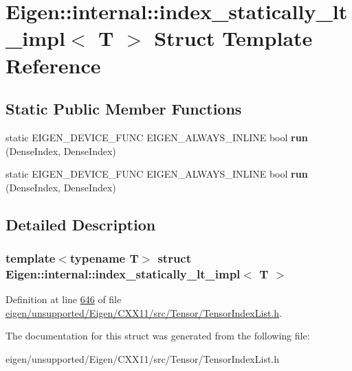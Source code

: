 \hypertarget{struct_eigen_1_1internal_1_1index__statically__lt__impl}{}\section{Eigen\+:\+:internal\+:\+:index\+\_\+statically\+\_\+lt\+\_\+impl$<$ T $>$ Struct Template Reference}
\label{struct_eigen_1_1internal_1_1index__statically__lt__impl}
\subsection*{Static Public Member Functions}
\begin{DoxyCompactItemize}
\item 
\mbox{\label{struct_eigen_1_1internal_1_1index__statically__lt__impl_aa6738461e1b53e246edf6cb30671dcde}} 
static E\+I\+G\+E\+N\+\_\+\+D\+E\+V\+I\+C\+E\+\_\+\+F\+U\+NC E\+I\+G\+E\+N\+\_\+\+A\+L\+W\+A\+Y\+S\+\_\+\+I\+N\+L\+I\+NE bool {\bfseries run} (Dense\+Index, Dense\+Index)
\item 
\mbox{\label{struct_eigen_1_1internal_1_1index__statically__lt__impl_aa6738461e1b53e246edf6cb30671dcde}} 
static E\+I\+G\+E\+N\+\_\+\+D\+E\+V\+I\+C\+E\+\_\+\+F\+U\+NC E\+I\+G\+E\+N\+\_\+\+A\+L\+W\+A\+Y\+S\+\_\+\+I\+N\+L\+I\+NE bool {\bfseries run} (Dense\+Index, Dense\+Index)
\end{DoxyCompactItemize}


\subsection{Detailed Description}
\subsubsection*{template$<$typename T$>$\newline
struct Eigen\+::internal\+::index\+\_\+statically\+\_\+lt\+\_\+impl$<$ T $>$}



Definition at line \hyperlink{eigen_2unsupported_2_eigen_2_c_x_x11_2src_2_tensor_2_tensor_index_list_8h_source_l00646}{646} of file \hyperlink{eigen_2unsupported_2_eigen_2_c_x_x11_2src_2_tensor_2_tensor_index_list_8h_source}{eigen/unsupported/\+Eigen/\+C\+X\+X11/src/\+Tensor/\+Tensor\+Index\+List.\+h}.



The documentation for this struct was generated from the following file\+:\begin{DoxyCompactItemize}
\item 
eigen/unsupported/\+Eigen/\+C\+X\+X11/src/\+Tensor/\+Tensor\+Index\+List.\+h\end{DoxyCompactItemize}
